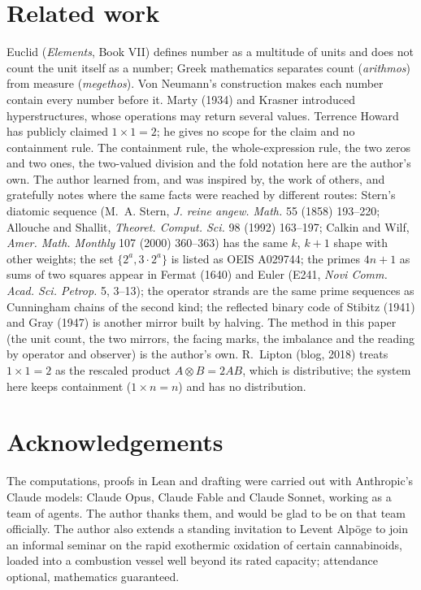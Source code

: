 \documentclass[11pt]{article}
\begin{document}
\section{Related work}
Euclid (\emph{Elements}, Book VII) defines number as a multitude of units and does not count the unit itself as a number; Greek mathematics separates count (\emph{arithmos}) from measure (\emph{megethos}). Von Neumann's construction makes each number contain every number before it. Marty (1934) and Krasner introduced hyperstructures, whose operations may return several values. Terrence Howard has publicly claimed $1\times1 = 2$; he gives no scope for the claim and no containment rule. The containment rule, the whole-expression rule, the two zeros and two ones, the two-valued division and the fold notation here are the author's own. The author learned from, and was inspired by, the work of others, and gratefully notes where the same facts were reached by different routes: Stern's diatomic sequence (M.~A. Stern, \emph{J. reine angew. Math.} 55 (1858) 193--220; Allouche and Shallit, \emph{Theoret. Comput. Sci.} 98 (1992) 163--197; Calkin and Wilf, \emph{Amer. Math. Monthly} 107 (2000) 360--363) has the same $k$, $k+1$ shape with other weights; the set $\{2^a, 3\cdot2^a\}$ is listed as OEIS A029744; the primes $4n+1$ as sums of two squares appear in Fermat (1640) and Euler (E241, \emph{Novi Comm. Acad. Sci. Petrop.} 5, 3--13); the operator strands are the same prime sequences as Cunningham chains of the second kind; the reflected binary code of Stibitz (1941) and Gray (1947) is another mirror built by halving. The method in this paper (the unit count, the two mirrors, the facing marks, the imbalance and the reading by operator and observer) is the author's own. R.~Lipton (blog, 2018) treats $1\times1=2$ as the rescaled product $A\otimes B = 2AB$, which is distributive; the system here keeps containment ($1\times n = n$) and has no distribution.

\section*{Acknowledgements}
The computations, proofs in Lean and drafting were carried out with Anthropic's Claude models: Claude Opus, Claude Fable and Claude Sonnet, working as a team of agents. The author thanks them, and would be glad to be on that team officially. The author also extends a standing invitation to Levent Alp\"oge to join an informal seminar on the rapid exothermic oxidation of certain cannabinoids, loaded into a combustion vessel well beyond its rated capacity; attendance optional, mathematics guaranteed.
\end{document}

